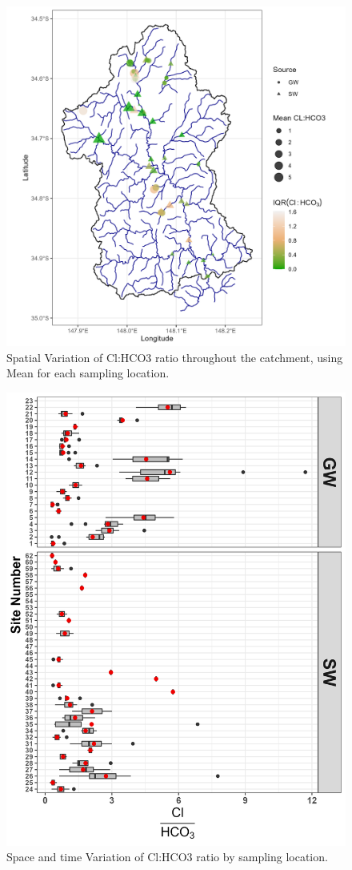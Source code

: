 \documentclass[, manuscript]{copernicus}
\begin{document}
\clearpage
\begin{figure}
\includegraphics[width=0.8\linewidth]{Figures/clhco3_map} \caption{Spatial Variation of Cl:HCO3 ratio throughout the catchment, using Mean for each sampling location.}\label{fig:Carbonate-map}
\end{figure}

\begin{figure}
\includegraphics[width=0.8\linewidth]{Figures/clhco3_plot} \caption{Space and time Variation of Cl:HCO3 ratio by sampling location.}\label{fig:Carbonate-boxplot}
\end{figure}
\end{document}
